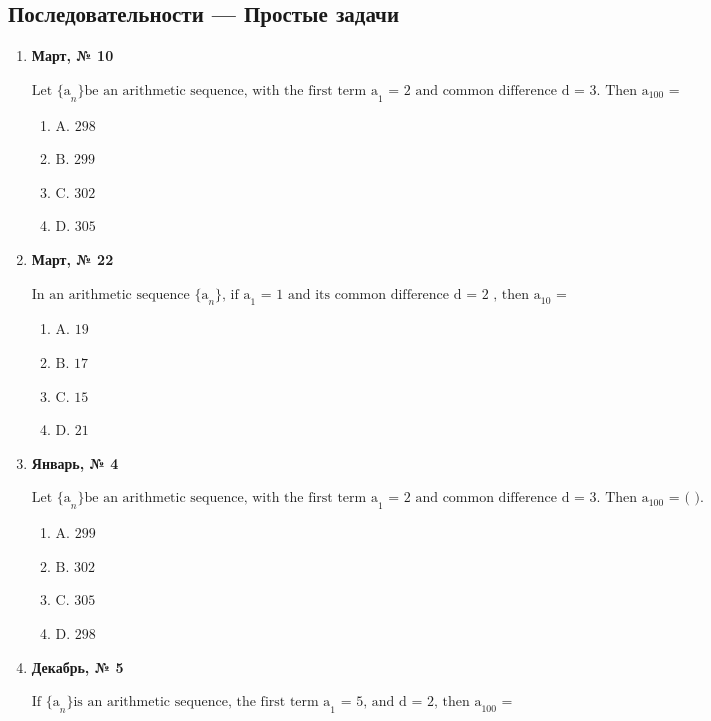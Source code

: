 \subsection*{Последовательности — Простые задачи}
\begin{enumerate}
\item \textbf{Март, № 10} \par \smallskip
$\displaystyle \text{Let \{a}_{n}\text{\} be an arithmetic sequence, with the first term a}_{1}\text{ = 2 and common difference d = 3. Then a}_{100}\text{ =}$
\begin{enumerate}
\item $\displaystyle \text{A. 298}$
\item $\displaystyle \text{B. 299}$
\item $\displaystyle \text{C. 302}$
\item $\displaystyle \text{D. 305}$
\end{enumerate}
\item \textbf{Март, № 22} \par \smallskip
$\displaystyle \text{In an arithmetic sequence \{a}_{n}\text{\} , if a}_{1}\text{ = 1 and its common difference d = 2 , then a}_{10}\text{ =}$
\begin{enumerate}
\item $\displaystyle \text{A. 19}$
\item $\displaystyle \text{B. 17}$
\item $\displaystyle \text{C. 15}$
\item $\displaystyle \text{D. 21}$
\end{enumerate}
\item \textbf{Январь, № 4} \par \smallskip
$\displaystyle \text{Let \{a}_{n}\text{\} be an arithmetic sequence, with the first term a}_{1}\text{ = 2 and common difference d = 3. Then a}_{100}\text{ = ( ).}$
\begin{enumerate}
\item $\displaystyle \text{A. 299}$
\item $\displaystyle \text{B. 302}$
\item $\displaystyle \text{C. 305}$
\item $\displaystyle \text{D. 298}$
\end{enumerate}
\item \textbf{Декабрь, № 5} \par \smallskip
$\displaystyle \text{If \{a}_{n}\text{\} is an arithmetic sequence, the first term a}_{1}\text{ = 5, and d = 2, then a}_{100}\text{ =}$

\end{enumerate}
